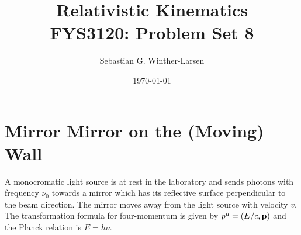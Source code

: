 \documentclass[11pt]{amsart}
\title[Relativistic Kinematics]{Relativistic Kinematics \\
	\hrulefill \small{ FYS3120: Problem Set 8 } \hrulefill}
\author[Winther-Larsen]{Sebastian G. Winther-Larsen}
\date{\today}
\begin{document}
\maketitle

\section{Mirror Mirror on the (Moving) Wall}

A monocromatic light source is at rest in the laboratory and sends photons with frequency $\nu_0$ towards a mirror which has its reflective surface perpendicular to the beam direction. The mirror moves away from the light source with velocity $v$. The transformation formula for four-momentum is given by $p^{\mu} = (E/c, \vb{p})$ and the Planck relation is $E=h\nu$.
\end{document}

